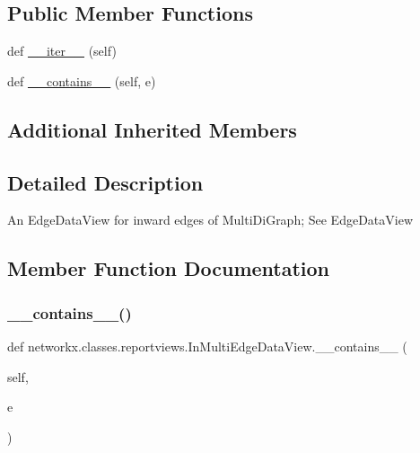 \subsection*{Public Member Functions}
\begin{DoxyCompactItemize}
\item 
def \hyperlink{classnetworkx_1_1classes_1_1reportviews_1_1InMultiEdgeDataView_a58aebf635bace60daec8fdfa4f351a5e}{\+\_\+\+\_\+iter\+\_\+\+\_\+} (self)
\item 
def \hyperlink{classnetworkx_1_1classes_1_1reportviews_1_1InMultiEdgeDataView_ac12c0c45982572532dbf33018c754d8d}{\+\_\+\+\_\+contains\+\_\+\+\_\+} (self, e)
\end{DoxyCompactItemize}
\subsection*{Additional Inherited Members}


\subsection{Detailed Description}
\begin{DoxyVerb}An EdgeDataView for inward edges of MultiDiGraph; See EdgeDataView\end{DoxyVerb}
 

\subsection{Member Function Documentation}
\mbox{\label{classnetworkx_1_1classes_1_1reportviews_1_1InMultiEdgeDataView_ac12c0c45982572532dbf33018c754d8d}} 
\subsubsection{\texorpdfstring{\+\_\+\+\_\+contains\+\_\+\+\_\+()}{\_\_contains\_\_()}}
{\footnotesize\ttfamily def networkx.\+classes.\+reportviews.\+In\+Multi\+Edge\+Data\+View.\+\_\+\+\_\+contains\+\_\+\+\_\+ (\begin{DoxyParamCaption}\item[{}]{self,  }\item[{}]{e }\end{DoxyParamCaption})}

